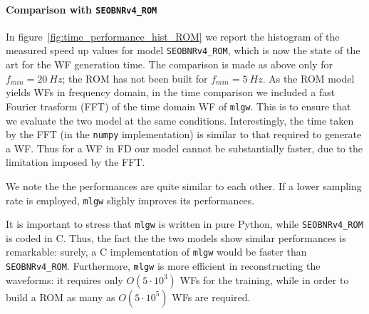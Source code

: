 \paragraph{Comparison with \texttt{SEOBNRv4\_ROM}}
In figure~\ref{fig:time_performance_hist_ROM} we report the histogram of the measured speed up values for model \texttt{SEOBNRv4\_ROM}, which is now the state of the art for the WF generation time.
The comparison is made as above only for $f_{min} = \SI{20}{Hz}$; the ROM has not been built for $f_{min} = \SI{5}{Hz}$.
As the ROM model yields WFs in frequency domain, in the time comparison we included a fast Fourier trasform (FFT) of the time domain WF of \texttt{mlgw}. This is to ensure that we evaluate the two model at the same conditions.
Interestingly, the time taken by the FFT (in the \texttt{numpy}
implementation) is similar to that required to generate a WF. Thus for
a WF in FD our model cannot be substantially faster, due to the
limitation imposed by the FFT.
\par
We note the the performances are quite similar to each other.
If a lower sampling rate is employed, \texttt{mlgw} slighly improves its performances.
\par
It is important to stress that \texttt{mlgw} is written in pure
Python, while \texttt{SEOBNRv4\_ROM} is coded in C. Thus, the fact the
the two models show similar performances is remarkable: surely, a C
implementation of \texttt{mlgw} would be faster than
\texttt{SEOBNRv4\_ROM}.
%
%
Furthermore, \texttt{mlgw} is more efficient in reconstructing the
waveforms: it requires only $O(5\cdot 10^3)$ WFs for the training,
while in order to build a ROM as many as $O(5\cdot 10^5)$ WFs are
required. 
\par

